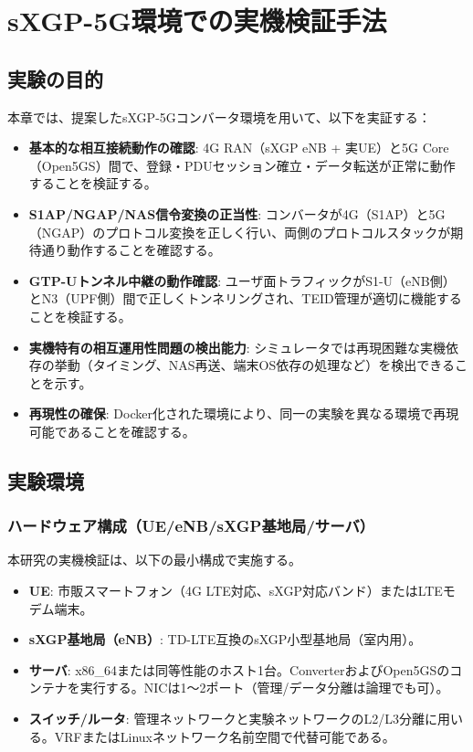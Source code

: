 \chapter{sXGP-5G環境での実機検証手法}
\label{chap:experiment}

\section{実験の目的}
本章では、提案したsXGP-5Gコンバータ環境を用いて、以下を実証する：

\begin{itemize}
	\item \textbf{基本的な相互接続動作の確認}: 4G RAN（sXGP eNB + 実UE）と5G Core（Open5GS）間で、登録・PDUセッション確立・データ転送が正常に動作することを検証する。

	\item \textbf{S1AP/NGAP/NAS信令変換の正当性}: コンバータが4G（S1AP）と5G（NGAP）のプロトコル変換を正しく行い、両側のプロトコルスタックが期待通り動作することを確認する。

	\item \textbf{GTP-Uトンネル中継の動作確認}: ユーザ面トラフィックがS1-U（eNB側）とN3（UPF側）間で正しくトンネリングされ、TEID管理が適切に機能することを検証する。

	\item \textbf{実機特有の相互運用性問題の検出能力}: シミュレータでは再現困難な実機依存の挙動（タイミング、NAS再送、端末OS依存の処理など）を検出できることを示す。

	\item \textbf{再現性の確保}: Docker化された環境により、同一の実験を異なる環境で再現可能であることを確認する。
\end{itemize}

\section{実験環境}
\subsection{ハードウェア構成（UE/eNB/sXGP基地局/サーバ）}
本研究の実機検証は、以下の最小構成で実施する。
\begin{itemize}
	\item \textbf{UE}: 市販スマートフォン（4G LTE対応、sXGP対応バンド）またはLTEモデム端末。
	\item \textbf{sXGP基地局（eNB）}: TD-LTE互換のsXGP小型基地局（室内用）。
	\item \textbf{サーバ}: x86\_64または同等性能のホスト1台。ConverterおよびOpen5GSのコンテナを実行する。NICは1～2ポート（管理/データ分離は論理でも可）。
	\item \textbf{スイッチ/ルータ}: 管理ネットワークと実験ネットワークのL2/L3分離に用いる。VRFまたはLinuxネットワーク名前空間で代替可能である。
\end{itemize}

